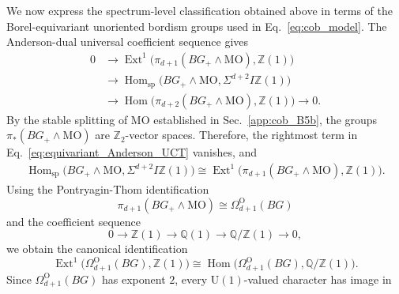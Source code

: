 \documentclass[aps,prx,reprint,superscriptaddress,twocolumn,amsmath,amssymb,amsfonts, nofootinbib]{revtex4-2}
\theoremstyle{apsstyle}
\begin{document}
We now express the spectrum-level classification obtained above in
terms of the Borel-equivariant unoriented bordism groups used in
Eq.~\eqref{eq:cob_model}. The Anderson-dual universal coefficient
sequence gives
\begin{equation}
\begin{aligned}
0&\longrightarrow
\operatorname{Ext}^{1}
\bigl(
    \pi_{d+1}(BG_+\wedge\mathrm{MO}),
    \mathbb Z(1)
\bigr)\\
&\longrightarrow
\operatorname{Hom}_{\mathrm{sp}}
\bigl(
    BG_+\wedge\mathrm{MO},
    \Sigma^{d+2}I\mathbb Z(1)
\bigr)
\\
&\longrightarrow
\operatorname{Hom}
\bigl(
    \pi_{d+2}(BG_+\wedge\mathrm{MO}),
    \mathbb Z(1)
\bigr)
\longrightarrow 0.
\end{aligned}
\label{eq:equivariant_Anderson_UCT}
\end{equation}
By the stable splitting of $\mathrm{MO}$ established in Sec.~\ref{app:cob_B5b}, the groups $\pi_*(BG_+\wedge\mathrm{MO})$ are $\mathbb Z_2$-vector spaces.
Therefore, the rightmost term in
Eq.~\eqref{eq:equivariant_Anderson_UCT} vanishes, and
\begin{equation}
\begin{aligned}
\operatorname{Hom}_{\mathrm{sp}}
\bigl(
    BG_+\wedge\mathrm{MO},
    \Sigma^{d+2}I\mathbb Z(1)
\bigr)
\cong
\operatorname{Ext}^{1}
\bigl(
    \pi_{d+1}(BG_+\wedge\mathrm{MO}),
    \mathbb Z(1)
\bigr).
\end{aligned}
\label{eq:equivariant_Anderson_Ext}
\end{equation}
Using the Pontryagin-Thom identification
\begin{equation*}
    \pi_{d+1}(BG_+\wedge\mathrm{MO})
    \cong
    \Omega_{d+1}^{\mathrm O}(BG)
\end{equation*}
and the coefficient sequence
\begin{equation*}
    0
    \longrightarrow
    \mathbb Z(1)
    \longrightarrow
    \mathbb Q(1)
    \longrightarrow
    \mathbb Q/\mathbb Z(1)
    \longrightarrow 0,
\end{equation*}
we obtain the canonical identification
\begin{equation*}
    \operatorname{Ext}^{1}
    \bigl(
        \Omega_{d+1}^{\mathrm O}(BG),
        \mathbb Z(1)
    \bigr)
    \cong
    \operatorname{Hom}
    \bigl(
        \Omega_{d+1}^{\mathrm O}(BG),
        \mathbb Q/\mathbb Z(1)
    \bigr).
\end{equation*}
Since $\Omega_{d+1}^{\mathrm O}(BG)$ has exponent $2$, every $\mathrm U(1)$-valued character has image in
\end{document}
